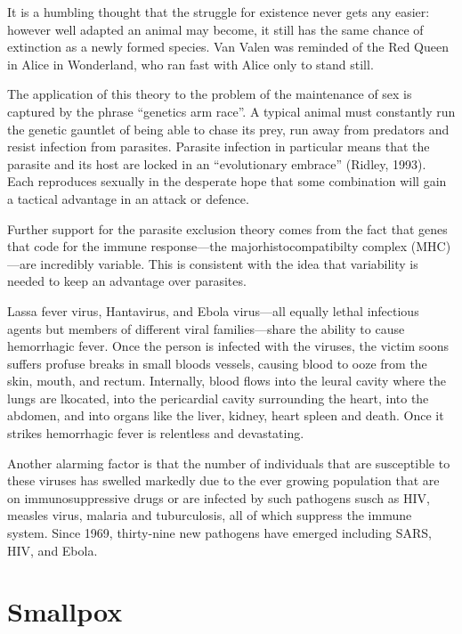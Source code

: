 It is a humbling thought that the struggle for existence never gets any easier: however well adapted an animal may become, it still has the same chance of extinction as a newly formed species. Van Valen was reminded of the Red Queen in Alice in Wonderland, who ran fast with Alice only to stand still. 

The application of this theory to the problem of the maintenance of sex is captured by the phrase “genetics arm race”. A typical animal must constantly run the genetic gauntlet   of being able to chase its prey, run away from predators and resist infection from parasites. Parasite infection in particular means that the parasite and its host are locked in an “evolutionary embrace” (Ridley, 1993). Each reproduces sexually in the desperate hope that some combination will gain a tactical advantage in an attack or defence. 

Further support for the parasite exclusion theory comes from the fact that genes that code for the immune response---the majorhistocompatibilty complex (MHC)---are incredibly variable. This is consistent with the idea that variability is needed to keep an advantage over parasites.

Lassa fever virus, Hantavirus, and Ebola virus---all equally lethal infectious agents but members of different viral families---share the ability to cause hemorrhagic fever. Once the person is infected with the viruses, the victim soons suffers profuse breaks in small bloods vessels, causing blood to ooze from the skin, mouth, and rectum. Internally, blood flows into the leural cavity where the lungs are lkocated, into the pericardial cavity surrounding the heart, into
the abdomen, and into organs like the liver, kidney, heart spleen and death. Once it strikes hemorrhagic fever is relentless and devastating.

Another alarming factor is that the number of individuals that are susceptible to these viruses has swelled markedly due to the ever growing population that are on immunosuppressive drugs or are infected by such pathogens susch as HIV, measles virus, malaria and tuburculosis, all of which suppress the immune system. Since 1969, thirty-nine new pathogens have emerged including SARS, HIV, and Ebola. 


\chapter{Smallpox}


